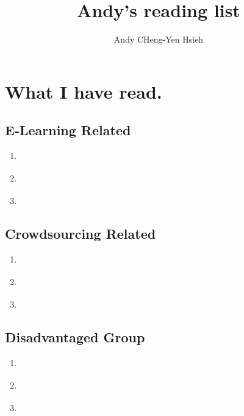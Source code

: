 \documentclass[a4paper]{article}
\title{\textbf{Andy's reading list}}
\author{Andy CHeng-Yen Hsieh}
\begin{document}
\maketitle

\section{What I have read.}

\subsection{E-Learning Related}
\begin{enumerate}
\item \cite{Bernstein2010b} \cite{Bernstein2010b} \cite{Bernstein2010b} 
\item \cite{Bernstein2010b} \cite{Bernstein2010b} \cite{Bernstein2010b} 
\item \cite{Bernstein2010b} \cite{Bernstein2010b} \cite{Bernstein2010b} 
\end{enumerate}
\subsection{Crowdsourcing Related}
\begin{enumerate}
\item \cite{Bernstein2010b}
\item \cite{Bernstein2010b}
\item \cite{Bernstein2010b}
\end{enumerate}
\subsection{Disadvantaged Group}
\begin{enumerate}
\item \cite{Bernstein2010b}
\item \cite{Bernstein2010b}
\item \cite{Bernstein2010b}
\end{enumerate}

 

\end{document}
